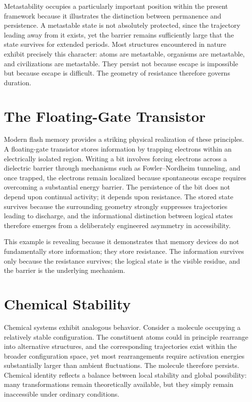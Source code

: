 \documentclass[11pt,oneside]{book}
\theoremstyle{plain}
\theoremstyle{definition}
\theoremstyle{remark}
\begin{document}
Metastability occupies a particularly important position within the present framework because it illustrates the distinction between permanence and persistence. A metastable state is not absolutely protected, since the trajectory leading away from it exists, yet the barrier remains sufficiently large that the state survives for extended periods. Most structures encountered in nature exhibit precisely this character: atoms are metastable, organisms are metastable, and civilizations are metastable. They persist not because escape is impossible but because escape is difficult. The geometry of resistance therefore governs duration.

\section{The Floating-Gate Transistor}

Modern flash memory provides a striking physical realization of these principles. A floating-gate transistor stores information by trapping electrons within an electrically isolated region. Writing a bit involves forcing electrons across a dielectric barrier through mechanisms such as Fowler–Nordheim tunneling, and once trapped, the electrons remain localized because spontaneous escape requires overcoming a substantial energy barrier. The persistence of the bit does not depend upon continual activity; it depends upon resistance. The stored state survives because the surrounding geometry strongly suppresses trajectories leading to discharge, and the informational distinction between logical states therefore emerges from a deliberately engineered asymmetry in accessibility.

This example is revealing because it demonstrates that memory devices do not fundamentally store information; they store resistance. The information survives only because the resistance survives; the logical state is the visible residue, and the barrier is the underlying mechanism.

\section{Chemical Stability}

Chemical systems exhibit analogous behavior. Consider a molecule occupying a relatively stable configuration. The constituent atoms could in principle rearrange into alternative structures, and the corresponding trajectories exist within the broader configuration space, yet most rearrangements require activation energies substantially larger than ambient fluctuations. The molecule therefore persists. Chemical identity reflects a balance between local stability and global possibility: many transformations remain theoretically available, but they simply remain inaccessible under ordinary conditions.
\end{document}
